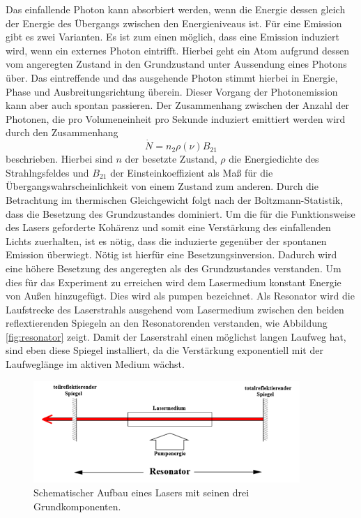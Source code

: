 Das einfallende Photon kann absorbiert werden, wenn die Energie dessen gleich der Energie des Übergangs zwischen den Energieniveaus ist.
Für eine Emission gibt es zwei Varianten.
Es ist zum einen möglich, dass eine Emission induziert wird, wenn ein externes Photon eintrifft.
Hierbei geht ein Atom aufgrund dessen vom angeregten Zustand in den Grundzustand unter Aussendung eines Photons über.
Das eintreffende und das ausgehende Photon stimmt hierbei in Energie, Phase und Ausbreitungsrichtung überein.
Dieser Vorgang der Photonemission kann aber auch spontan passieren.
Der Zusammenhang zwischen der Anzahl der Photonen, die pro Volumeneinheit pro Sekunde induziert emittiert werden wird durch den Zusammenhang
\begin{equation}
  \dot{N} = n_2\rho(\nu)B_\text{21}
\end{equation}
beschrieben.
Hierbei sind $n$ der besetzte Zustand, $\rho$ die Energiedichte des Strahlngsfeldes und $B_\text{21}$ der Einsteinkoeffizient als Maß für die Übergangswahrscheinlichkeit von einem Zustand zum anderen.
Durch die Betrachtung im thermischen Gleichgewicht folgt nach der Boltzmann-Statistik, dass die Besetzung des Grundzustandes dominiert.
Um die für die Funktionsweise des Lasers geforderte Kohärenz und somit eine Verstärkung des einfallenden Lichts zuerhalten, ist es nötig, dass die induzierte gegenüber der spontanen Emission überwiegt.
Nötig ist hierfür eine Besetzungsinversion.
Dadurch wird eine höhere Besetzung des angeregten als des Grundzustandes verstanden.
Um dies für das Experiment zu erreichen wird dem Lasermedium konstant Energie von Außen hinzugefügt.
Dies wird als pumpen bezeichnet.
Als Resonator wird die Laufstrecke des Laserstrahls ausgehend vom Lasermedium zwischen den beiden reflextierenden Spiegeln an den Resonatorenden verstanden, wie Abbildung \ref{fig:resonator} zeigt.
Damit der Laserstrahl einen möglichst langen Laufweg hat, sind eben diese Spiegel installiert, da die Verstärkung exponentiell mit der Laufweglänge im aktiven Medium wächst.

\begin{figure}[H]
  \centering
  \includegraphics[width=0.9\textwidth]{Bilder/resonator.png}
  \caption{Schematischer Aufbau eines Lasers mit seinen drei Grundkomponenten.\cite{anleitung}}
  \label{fig:emission}
\end{figure}

